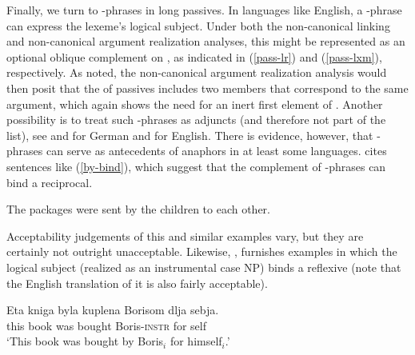\documentclass[output=paper
                ,modfonts
                ,nonflat
	        ,collection
	        ,collectionchapter
	        ,collectiontoclongg
 	        ,biblatex
                ,babelshorthands
                ,newtxmath
                ,draftmode
                ,colorlinks, citecolor=brown
]{./langsci/langscibook}
\begin{document}

Finally, we turn to -phrases in long passives.
In languages like English, a -phrase can express the lexeme's logical subject.
Under both the non-canonical linking and non-canonical argument realization analyses, this might be represented as an optional oblique complement on \argst, as indicated in (\ref{pass-lr}) and (\ref{pass-lxm}), respectively.
As noted, the non-canonical argument realization analysis would then posit that the \argst of passives includes two members that correspond to the same argument, which again shows the need for an inert first element of \argst.
Another possibility is to treat such -phrases as adjuncts (and therefore not part of the \argst list), see \citet[Chapter 7]{Hoehle78a} and \citet[292--294]{Mueller2003e} for German and \citet[180]{Jackendoff1990} for English. 
There is evidence, however, that -phrases can serve as antecedents of anaphors in at least some languages.
\citet[111]{Collins2005} cites sentences like (\ref{by-bind}), which suggest that the complement of -phrases can bind a reciprocal.

\begin{exe}
\ex\label{by-bind}The packages were sent by the children to each other.
\end{exe} 

Acceptability judgements of this and similar examples vary, but they are certainly not outright unacceptable.  Likewise, \citet[10]{Perlmutter1984}, furnishes  examples in which the logical subject (realized as an instrumental case NP) binds a reflexive (note that the English translation of it is also fairly acceptable).

\begin{exe}
\ex     \label{russian-pass}
             \gll Eta kniga byla kuplena Borisom dlja sebja.  \\
             this book was bought Boris-\textsc{instr} for self  \\
             \glt `This book was bought by Boris$_{i}$ for himself$_{i}$.'
\end{exe}
\end{document}
